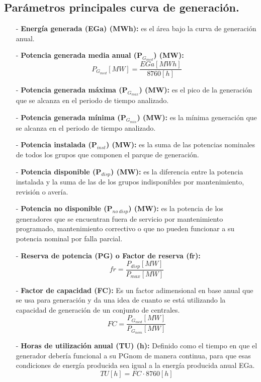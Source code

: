 \subsection{Parámetros principales curva de generación.}
\begin{itemize}
	\item [-]\textbf{Energía generada (EGa) (MWh):} es el área bajo la curva de generación anual.
	\item [-]\textbf{Potencia generada media anual (P$_{G_{med}}$) (MW):} 
		\[P_{G_{med}}[MW]=\frac{EGa[MWh]}{8760[h]}\]
	\item [-]\textbf{Potencia generada máxima (P$_{G_{max}}$) (MW):}  es el pico de la generación que se alcanza en el
	periodo de tiempo analizado.
	\item [-]\textbf{Potencia generada mínima (P$_{G_{min}}$) (MW):}  es la mínima generación que se alcanza en el periodo
	de tiempo analizado.
	\item [-]\textbf{Potencia instalada (P$_{inst}$) (MW):}  es la suma de las potencias nominales de todos los grupos que
	componen el parque de generación.
	\item [-]\textbf{Potencia disponible (P$_{disp}$) (MW):}  es la diferencia entre la potencia instalada y la suma de las de
	los grupos indisponibles por mantenimiento, revisión o avería.
	\item [-]\textbf{Potencia no disponible (P$_{no\ disp}$) (MW):} es la potencia de los generadores que se encuentran
	fuera de servicio por mantenimiento programado, mantenimiento correctivo o
	que no pueden funcionar a su potencia nominal por falla parcial.
	\item [-]\textbf{Reserva de potencia (PG) o Factor de reserva (fr):}
	\[fr=\frac{P_{disp}[MW]}{P_{max}[MW]}\]
	\item [-]\textbf{Factor de capacidad (FC):}  Es un factor adimensional en base anual que se usa para generación y da una idea de cuanto se está utilizando
	la capacidad de generación de un conjunto de centrales.
	\[FC=\frac{P_{G_{med}}[MW]}{P_{G_{nom}}[MW]}\]
	\item [-]\textbf{Horas de utilización anual (TU) (h):} Definido como el tiempo en que el generador debería funcional a su PGnom de manera continua, para que esas
	condiciones de energía producida sea igual a la energía producida anual EGa.
	\[TU [h]=FC\cdot 8760 [h]\]
\end{itemize}
\newpage
